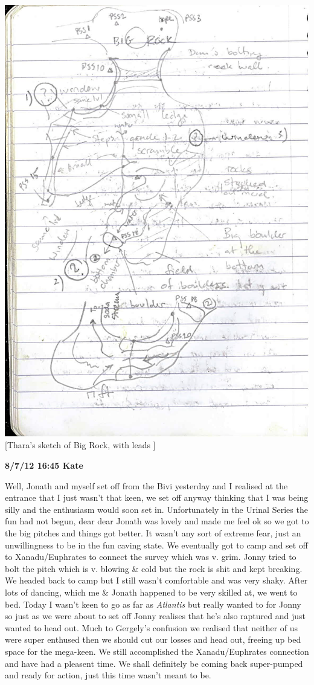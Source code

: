 \includegraphics{UgLog1012/88.jpeg}\\
{[}Thara's sketch of Big Rock, with leads {]}

\textbf{8/7/12 16:45 Kate}

Well, Jonath and myself set off from the Bivi yesterday and I realised
at the entrance that I just wasn't that keen, we set off anyway thinking
that I was being silly and the enthusiasm would soon set in.
Unfortunately in the Urinal Series the fun had not begun, dear dear
Jonath was lovely and made me feel ok so we got to the big pitches and
things got better. It wasn't any sort of extreme fear, just an
unwillingness to be in the fun caving state. We eventually got to camp
and set off to Xanadu/Euphrates to connect the survey which was v. grim.
Jonny tried to bolt the pitch which is v. blowing \& cold but the rock
is shit and kept breaking. We headed back to camp but I still wasn't
comfortable and was very shaky. After lots of dancing, which me \&
Jonath happened to be very skilled at, we went to bed. Today I wasn't
keen to go as far as \emph{Atlantis} but really wanted to for Jonny so
just as we were about to set off Jonny realises that he's also raptured
and just wanted to head out. Much to Gergely's confusion we realised
that neither of us were super enthused then we should cut our losses and
head out, freeing up bed space for the mega-keen. We still accomplished
the Xanadu/Euphrates connection and have had a pleasent time. We shall
definitely be coming back super-pumped and ready for action, just this
time wasn't meant to be.

